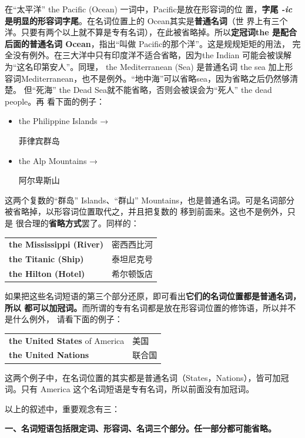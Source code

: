 在“太平洋” the Pacific (Ocean) 一词中，Pacific是放在形容词的位
置，\textbf{字尾 \emph{-ic} 是明显的形容词字尾}。在名词位置上的 Ocean其实是\textbf{普通名词}（世
界上有三个洋。只要有两个以上就不算是专有名词），在此被省略掉。所以\textbf{定冠词the
  是配合后面的普通名词 Ocean}，指出“叫做 Pacific的那个洋”。这是规规矩矩的用法，
完全没有例外。在三大洋中只有印度洋不适合省略，因为the Indian 可能会被误解
为“这名印第安人”。同理， the Mediterranean (Sea) 是普通名词 the sea 加上形
容词Mediterranean，也不是例外。“地中海”可以省略sea，因为省略之后仍然够清楚。
但“死海” the Dead Sea就不能省略，否则会被误会为“死人” the dead people。再
看下面的例子：

\begin{itemize}
\item  the Philippine Islands → 

菲律宾群岛
\item  the Alp Mountains → 

阿尔卑斯山
\end{itemize}

这两个复数的“群岛” Islands、“群山” Mountains，也是普通名词。可是名词部分
被省略掉，以形容词位置取代之，并且把复数的  移到前面来。这也不是例外，只是
很合理的\textbf{省略方式}罢了。同样的：

\begin{longtable}[]{@{}ll@{}}
  \textbf{the Mississippi (River)} & 密西西比河 \\
  \textbf{the Titanic (Ship)} & 泰坦尼克号 \\
  \textbf{the Hilton (Hotel)} & 希尔顿饭店 \\
\end{longtable}

如果把这些名词短语的第三个部分还原，即可看出\textbf{它们的名词位置都是普通名词，所以
  都可以加冠词。}而所谓的专有名词都是放在形容词位置的修饰语，所以并不是什么例外，
请看下面的例子：

\begin{longtable}[]{@{}ll@{}}
  \textbf{the United States} of America& 美国 \\
  \textbf{the United Nations} & 联合国 \\
\end{longtable}

这两个例子中，在名词位置的其实都是普通名词（States，Nations），皆可加冠词。只有
America 这个名词短语是专有名词，所以前面没有加冠词。

以上的叙述中，重要观念有三：

\textbf{一、名词短语包括限定词、形容词、名词三个部分。任一部分都可能省略。}

